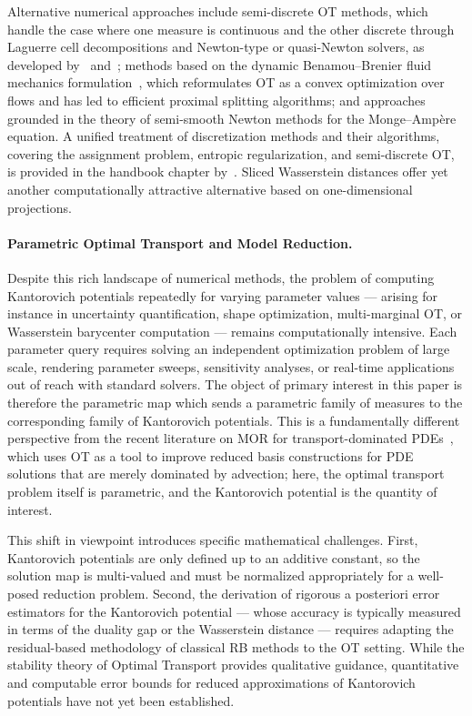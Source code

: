 \documentclass{article}
\begin{document}
Alternative numerical approaches include semi-discrete OT methods, which handle the case where one measure is continuous and the other discrete through Laguerre cell decompositions and Newton-type or quasi-Newton solvers, as developed by~\cite{merigot2011multiscale} and~\cite{levy2015numerical}; methods based on the dynamic Benamou–Brenier fluid mechanics formulation~\cite{benamou2000computational}, which reformulates OT as a convex optimization over flows and has led to efficient proximal splitting algorithms; and approaches grounded in the theory of semi-smooth Newton methods for the Monge–Ampère equation. A unified treatment of discretization methods and their algorithms, covering the assignment problem, entropic regularization, and semi-discrete OT, is provided in the handbook chapter by~\cite{merigot2021optimal}. Sliced Wasserstein distances offer yet another computationally attractive alternative based on one-dimensional projections.

\paragraph{Parametric Optimal Transport and Model Reduction.} 
Despite this rich landscape of numerical methods, the problem of computing Kantorovich potentials repeatedly for varying parameter values — arising for instance in uncertainty quantification, shape optimization, multi-marginal OT, or Wasserstein barycenter computation — remains computationally intensive. Each parameter query requires solving an independent optimization problem of large scale, rendering parameter sweeps, sensitivity analyses, or real-time applications out of reach with standard solvers. The object of primary interest in this paper is therefore the parametric map which sends a parametric family of measures to the corresponding family of Kantorovich potentials. This is a fundamentally different perspective from the recent literature on MOR for transport-dominated PDEs~\cite{cagniart2018model,blickhan2024registration}, which uses OT as a tool to improve reduced basis constructions for PDE solutions that are merely dominated by advection; here, the optimal transport problem itself is parametric, and the Kantorovich potential is the quantity of  interest.


This shift in viewpoint introduces specific mathematical challenges. First, Kantorovich potentials are only defined up to an additive constant, so the solution map is multi-valued and must be normalized appropriately for a well-posed reduction problem. Second, the derivation of rigorous a posteriori error estimators for the Kantorovich potential — whose accuracy is typically measured in terms of the duality gap or the Wasserstein distance — requires adapting the residual-based methodology of classical RB methods to the OT setting. While the stability theory of Optimal Transport provides qualitative guidance, quantitative and computable error bounds for reduced approximations of Kantorovich potentials have not yet been established.
\end{document}

